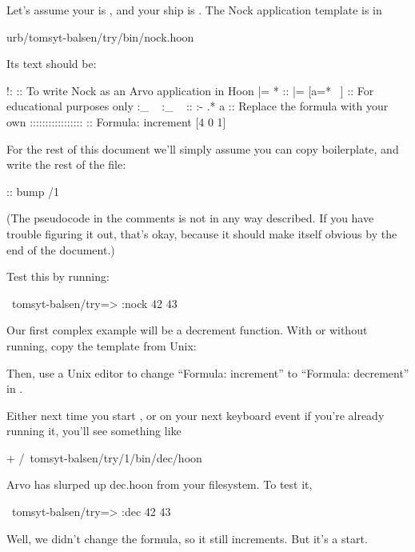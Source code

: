 Let's assume your  is , and your ship is
.  The Nock application template is in

\begin{code}
urb/tomsyt-balsen/try/bin/nock.hoon
\end{code}
Its text should be:

\begin{code}
!:             ::  To write Nock as an Arvo application in Hoon
|=  *          ::
|=  [a=* ~]    ::  For educational purposes only
:_  ~  :_  ~   ::
:-  %
.*  a          ::  Replace the formula with your own
:::::::::::::::::
               ::  Formula: increment
[4 0 1]
\end{code}
For the rest of this document we'll simply assume you can copy
boilerplate, and write the rest of the file:

\begin{code}
[4 0 1]                                      ::    bump /1
\end{code}
(The pseudocode in the comments is not in any way described.  If
you have trouble figuring it out, that's okay, because it should
make itself obvious by the end of the document.)

Test this by running:

\begin{code}
~tomsyt-balsen/try=> :nock 42
43
\end{code}
Our first complex example will be a decrement function.  With or
without  running, copy the template from Unix:

Then, use a Unix editor to change ``Formula: increment'' to
``Formula: decrement'' in .

Either next time you start , or on your next keyboard event
if you're already running it, you'll see something like

\begin{code}
 + /~tomsyt-balsen/try/1/bin/dec/hoon
\end{code}
Arvo has slurped up dec.hoon from your filesystem.  To test it,

\begin{code}
~tomsyt-balsen/try=> :dec 42
43
\end{code}
Well, we didn't change the formula, so it still increments.  But
it's a start.

